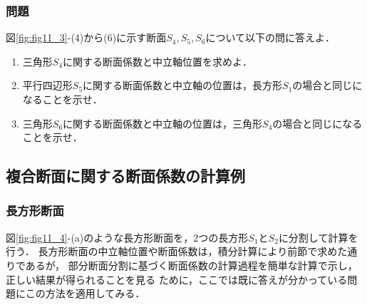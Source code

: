 \documentclass[10pt,a4j]{jarticle}
\begin{document}
\subsubsection{問題}
図\ref{fig:fig11_3}-(4)から(6)に示す断面$S_4,S_5,S_6$について以下の問に答えよ．
\begin{enumerate}
\item
三角形$S_4$に関する断面係数と中立軸位置を求めよ．
\item
平行四辺形$S_5$に関する断面係数と中立軸の位置は，長方形$S_1$の場合と同じになることを示せ．
\item
三角形$S_6$に関する断面係数と中立軸の位置は，三角形$S_4$の場合と同じになることを示せ．
\end{enumerate}
\subsection{複合断面に関する断面係数の計算例}
\subsubsection{長方形断面}
図\ref{fig:fig11_4}-(a)のような長方形断面を，2つの長方形$S_1$と$S_2$に分割して計算を行う．
長方形断面の中立軸位置や断面係数は，積分計算により前節で求めた通りであるが，
部分断面分割に基づく断面係数の計算過程を簡単な計算で示し，正しい結果が得られることを見る
ために，ここでは既に答えが分かっている問題にこの方法を適用してみる．
\end{document}
